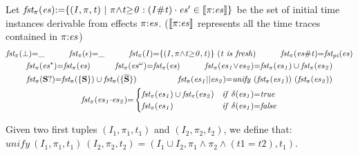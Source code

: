 \documentclass[acmsmall,10pt,review]{acmart}
\newcommand{\es}{\textcolor{black}{\ensuremath{{es}}}}
\newcommand\pure[1]{ \textcolor{black}{#1}}
\newcommand{\seq}{\cdot}
\newcommand{\code}[1]{{\tt{\ensuremath{\m{#1}}}}}
\newcommand{\esn}[2]{\ensuremath{#1^{#2}}}
\newcommand{\empt}{\textcolor{black}{\ensuremath{\epsilon}}}
\newcommand{\bott}{\textcolor{black}{\ensuremath{\bot}}}
\newcommand{\m}{\mathit}
\begin{document}
{\begin{definition}[First]\label{First}
Let \code{fst_{\pure{\pi}}(\es){:=}\{ (I,  \pi, t) \ |\  \pi {\wedge} t{\geq}0 : (I\# t) \cdot \es^\prime \in \llbracket  \pi {:} \es \rrbracket \}} be the set of initial time instances derivable from effects \code{\pi {:} \es}. (\code{\llbracket  \pi {:} \es \rrbracket } represents all the time  traces contained in \code{\pi {:} \es}) 
{ 
 \begin{gather*} 
\code{fst_{\pure{\pi}}( \bott) {=} \_ } \qquad\quad
\code{fst_{\pure{\pi}}(\empt) {=} \_ } \qquad\quad
\code{fst_{\pure{\pi}}( I ) {=} \{ (I, \pi {\wedge} t{\geq}0, t) \}  \ (t\ is\ fresh)} 
\qquad\quad
   \code{fst_{\pure{\pi}}(  \es \# t) {=}  fst_{pi}(\es)}
 \\
\code{fst_{\pure{\pi}}( \esn{\es}{\star} ) {=} fst_{\pure{\pi}}({ \es})}
\qquad\quad
\code{fst_{\pure{\pi}}( \esn{\es}{\omega} ) {=} fst_{\pure{\pi}}({ \es})} 
\qquad\quad
\code{fst_{\pure{\pi}}(  \es_1 {\vee} \es_2) {=} fst_{\pure{\pi}}(  \es_1) \cup fst_{\pure{\pi}}(  \es_2)  }  \\
\code{fst_{\pure{\pi}}( \textbf{S}? ) {=} fst_{\pure{\pi}}( \{\textbf{S}\} ) \cup fst_{\pure{\pi}}( \{ \overline{\textbf{S}} \} ) }
    \qquad\qquad\quad
   \code{fst_{\pure{\pi}}(  \es_1 {||} \es_2) {=} unify \ 
    (fst_{\pure{\pi}}(  \es_1)) \  (fst_{\pure{\pi}}(  \es_2))  }  
   \\
{
\code{fst_{\pure{\pi}}(\es_1 {\seq} \es_2) {=} } 
\begin{cases}
      \code{\code{fst_{\pure{\pi}}(  \es_1)} \cup \code{fst_{\pure{\pi}}(  \es_2)} } & \code{ if\ \delta(\es_1) {=} true}\\
      \code{\code{fst_{\pure{\pi}}(  \es_1)}} & \code{  if\ \delta(\es_1) {=} false}
    \end{cases} 
    }  
\end{gather*}
}
\end{definition}


\begin{definition}\label{unify} Given two first tuples \code{(I_1, \pi_1, t_1)} and \code{(I_2, \pi_2, t_2) }, we define that: 
\code{unify\ (I_1, \pi_1, t_1)\  (I_2, \pi_2, t_2) = (I_1 \cup I_2, \pi_1 \wedge \pi_2 \wedge (t1 {=} t2), t_1)}.
\end{definition}


}
\end{document}
